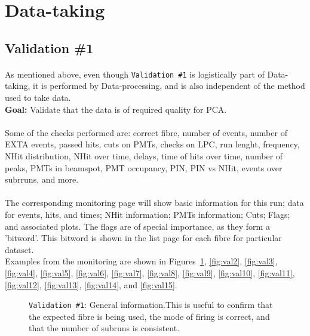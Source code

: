 \documentclass[12pt]{article}
\begin{document}
\section{Data-taking}
\subsection{Validation \#1}\label{sec:val1}
\paragraph{}
As mentioned above, even though \texttt{Validation \#1} is logistically part of Data-taking, it is performed by Data-processing, and is also independent of the method used to take data.\\
\textbf{Goal:} Validate that the data is of required quality for PCA.

\paragraph{}
Some of the checks performed are: correct fibre, number of events, number of EXTA events, passed hits, cuts on PMTs, checks on LPC, run lenght, frequency, NHit distribution, NHit over time, delays, time of hits over time, number of peaks, PMTs in beamspot, PMT occupancy, PIN, PIN vs NHit, events over subrruns, and more.

\paragraph{}
The corresponding monitoring page will show basic information for this run; data for events, hits, and times; NHit information; PMTs information; Cuts; Flags; and associated plots. The flags are of special importance, as they form a 'bitword'. This bitword is shown in the list page for each fibre for particular dataset.\\
Examples from the monitoring are shown in Figures~\ref{fig:val1}, \ref{fig:val2}, \ref{fig:val3}, \ref{fig:val4}, \ref{fig:val5}, \ref{fig:val6}, \ref{fig:val7}, \ref{fig:val8}, \ref{fig:val9}, \ref{fig:val10}, \ref{fig:val11}, \ref{fig:val12}, \ref{fig:val13}, \ref{fig:val14}, and \ref{fig:val15}.

\begin{figure}
\centering
\noindent{}
  \caption{\centering \texttt{Validation \#1}: General information.\hspace{\textwidth}This is useful to confirm that the expected fibre is being used, the mode of firing is correct, and that the number of subruns is consistent.}
  \label{fig:val1}
\end{figure}
\end{document}
